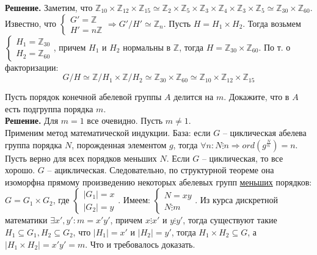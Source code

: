 \documentclass[a4paper, 12pt]{article}
\newcommand{\Z}{\mathbb{Z}}
\newcommand{\x}{\times}
\begin{document}
\begin{spacing}{1}
\noindent \textbf{Решение.} Заметим, что $\mathbb{Z}_{10}\times\mathbb{Z}_{12}\times\mathbb{Z}_{15} \simeq \Z_2 \x \Z_5 \x \Z_3 \x \Z_4 \x \Z_3 \x \Z_5 \simeq \Z_{30}\x\Z_{60}$.\\
Известно, что $\begin{cases}
	G' = \Z\\
	H' = n\Z
\end{cases}\Rightarrow G'/H' \simeq \Z_n$. Пусть $H = H_1 \x H_2$. Тогда возьмем $\begin{cases}
	H_1 = \Z_{30}\\
	H_2 = \Z_{60}
\end{cases}$, причем $H_1$ и $H_2$ нормальны в $\Z$, тогда $H = \Z_{30} \x \Z_{60}$. По т. о факторизации:
$$
G/H \simeq \Z / H_1 \x \Z/H_2 \simeq \Z_{30}\x \Z_{60} \simeq \mathbb{Z}_{10}\times\mathbb{Z}_{12}\times\mathbb{Z}_{15}
$$




\begin{center}
\end{center}

\noindent Пусть порядок конечной абелевой группы $A$ делится на $m$. Докажите, что в $A$ есть подгруппа порядка $m$.\\

\noindent \textbf{Решение.} Для $m = 1$ все очевидно. Пусть $m \neq 1$.\\
Применим метод математической индукции. База: если $G$ -- циклическая абелева группа порядка $N$, порожденная элементом $g$, тогда $\forall n: N \vdots n \Rightarrow ord(g^{\frac{N}{n}}) = n$. Пусть верно для всех порядков меньших $N$. Если $G$ -- циклическая, то все хорошо. $G$ -- ациклическая. Следовательно, по структурной теореме она изоморфна прямому произведению некоторых абелевых групп \underline{меньших} порядков:
$G = G_1\x G_2$, где $\begin{cases}
	|G_1| = x \\
	|G_2| = y
\end{cases}$. Имеем: $\begin{cases}
    N = xy\\
    N \vdots m
\end{cases}$. Из курса дискретной математики $\exists x', y': m = x'y'$, причем $x\vdots x'$ и $y \vdots y'$, тогда существуют такие $H_1\subseteq G_1, H_2\subseteq G_2$, что $|H_1| = x'$ и $|H_2| = y'$, тогда $H_1\x H_2 \subseteq G$, а $|H_1\x H_2| = x'y' = m$. Что и требовалось доказать.


\end{spacing}
\end{document}
